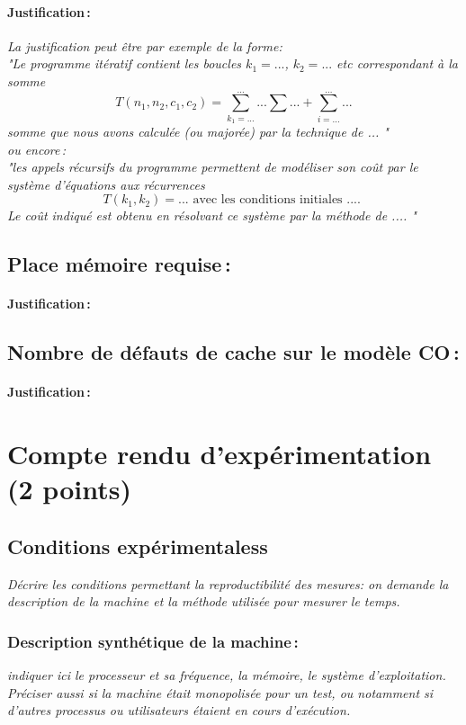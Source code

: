 \documentclass[a4paper, 10pt, english]{article}
\begin{document}
    \paragraph{Justification\,: }
    {\em La justification peut être par exemple de la forme: \\ 
       "Le programme itératif contient les boucles $k_1=...$, $k_2= ...$ etc correspondant à la somme 
      $$T(n_1, n_2, c_1, c_2) = \sum_{k_1=...}^{...} ... \sum ... + \sum_{i=...}^{...} ...$$ 
      somme que nous avons calculée (ou majorée) par la technique de  ... " \\
      ou  encore\,:  \\
      "les appels récursifs du programme permettent de modéliser son coût par le système d'équations aux récurrences 
      $$T(k_1, k_2) = ...  \mbox{~avec~les~conditions~initiales~....~} $$
      Le coût indiqué est obtenu en résolvant ce système par la méthode de  .... "
    } 
  \subsection{Place mémoire requise\,: }
    \paragraph{Justification\,: }

  \subsection{Nombre de défauts de cache sur le modèle CO\,: }
    \paragraph{Justification\,: }


\section{Compte rendu d'expérimentation (2 points)}
  \subsection{Conditions expérimentaless}
     {\em Décrire les conditions permettant la reproductibilité des mesures: on demande la description
      de la machine et la méthode utilisée pour mesurer le temps.
     }

    \subsubsection{Description synthétique de la machine\,:} 
      {\em indiquer ici le  processeur et sa fréquence, la mémoire, le système d'exploitation. 
       Préciser aussi si la machine était monopolisée pour un test, ou notamment si 
       d'autres processus ou utilisateurs étaient en cours d'exécution. 
      } 
\end{document}

